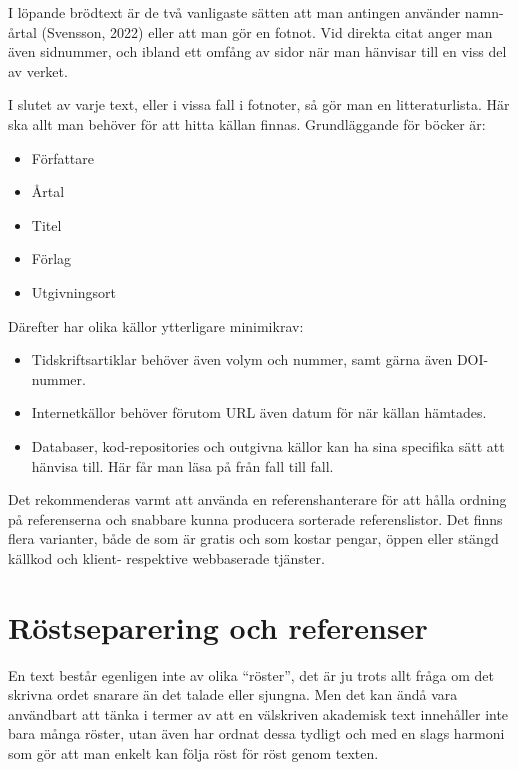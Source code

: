 \documentclass[11pt,a5paper,footinclude=true,headinclude=true]{scrbook} %
\begin{document}
I löpande brödtext är de två vanligaste sätten att man antingen använder namn-årtal (Svensson, 2022) eller att man gör en fotnot. Vid direkta citat anger man även sidnummer, och ibland ett omfång av sidor när man hänvisar till en viss del av verket. 

I slutet av varje text, eller i vissa fall i fotnoter, så gör man en litteraturlista. Här ska allt man behöver för att hitta källan finnas. Grundläggande för böcker är:

\begin{small}
\begin{itemize}
\item Författare
\item Årtal
\item Titel
\item Förlag
\item Utgivningsort
\end{itemize}
\end{small}

\noindent Därefter har olika källor ytterligare minimikrav:

\begin{small}
\begin{itemize}
\item Tidskriftsartiklar behöver även volym och nummer, samt gärna även DOI-nummer.
\item Internetkällor behöver förutom URL även datum för när källan hämtades.
\item  Databaser, kod-repositories och outgivna källor kan ha sina specifika sätt att hänvisa till. Här får man läsa på från fall till fall.
\end{itemize}
\end{small}

\noindent Det rekommenderas varmt att använda en referenshanterare för att hålla ordning på referenserna och snabbare kunna producera sorterade referenslistor. Det finns flera varianter, både de som är gratis och som kostar pengar, öppen eller stängd källkod och klient- respektive webbaserade tjänster. 

\section{Röstseparering och referenser}

En text består egenligen inte av olika ``röster'', det är ju trots allt fråga om det skrivna ordet snarare än det talade eller sjungna. Men det kan ändå vara användbart att tänka i termer av att en välskriven akademisk text innehåller inte bara många röster, utan även har ordnat dessa tydligt och med en slags harmoni som gör att man enkelt kan följa röst för röst genom texten. 
\end{document}
